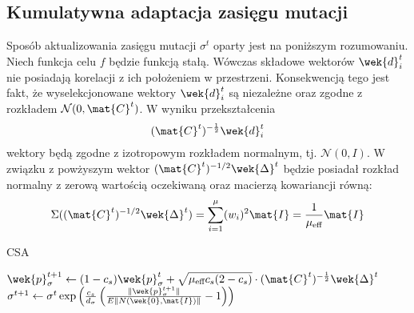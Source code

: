 \subsection{Kumulatywna adaptacja zasięgu mutacji \label{CSA}}
Sposób aktualizowania zasięgu mutacji $\sigma^t$ oparty jest na poniższym rozumowaniu. Niech funkcja celu $f$ będzie funkcją stałą. Wówczas składowe wektorów $\wek{d}_i^t$ nie posiadają korelacji z ich położeniem w przestrzeni.
Konsekwencją tego jest fakt, że wyselekcjonowane wektory  $\wek{d}_i^t$ są niezależne oraz zgodne z rozkładem $\mathcal{N}(0, \mat{C}^{t})$. W wyniku przekształcenia
  \begin{equation}
    (\mat{C}^{t})^{-\frac{1}{2}}\wek{d}_{i}^{t}
  \end{equation}
  wektory będą zgodne z izotropowym rozkładem normalnym, tj. $\mathcal{N}(0, I)$. W związku z powżyszym wektor $(\mat{C}^t)^{-1/2} \wek{\Delta}^t$ będzie posiadał rozkład normalny z zerową wartością oczekiwaną
  oraz macierzą kowariancji równą:
  \begin{equation}
    \Sigma((\mat{C}^t)^{-1/2} \wek{\Delta}^t) = \sum_{i=1}^\mu (w_i)^2 \mat{I}=\frac{1}{\mu_\text{eff}} \mat{I}
    \label{eq:01}
  \end{equation}
\setcounter{algorithm}{0}
\begin{algorithm}[h]
\caption{CSA}
\begin{algorithmic}[1]
   \STATE $\wek{p}_\sigma^{t+1} \gets (1-c_s)\wek{p}_\sigma^t + \sqrt{\mu_\text{eff} c_s(2-c_s)} \cdot (\mat{C}^t)^{-\frac{1}{2}}\wek{\Delta}^t$
   \STATE $\sigma^{t+1} \gets \sigma^t \exp\left(\frac{c_s}{d_\sigma} \left(\frac{\| \wek{p}_\sigma^{t+1} \|}{E\|N(\wek{0},\mat{I})\|}-1\right)\right) $
\end{algorithmic}
\end{algorithm}

